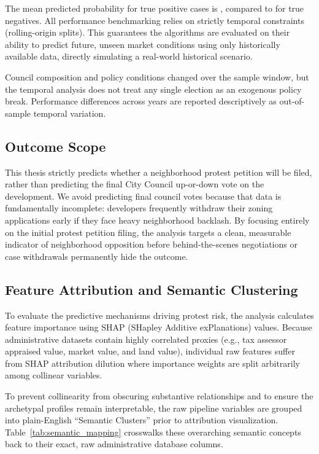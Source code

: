 \documentclass[11pt, letterpaper]{article}
\begin{document}
The mean predicted probability for true positive cases is \metricMeanProbTP{}, compared to \metricMeanProbTN{} for true negatives. All performance benchmarking relies on strictly temporal constraints (rolling-origin splits). This guarantees the algorithms are evaluated on their ability to predict future, unseen market conditions using only historically available data, directly simulating a real-world historical scenario.

Council composition and policy conditions changed over the sample window, but the temporal analysis does not treat any single election as an exogenous policy break. Performance differences across years are reported descriptively as out-of-sample temporal variation.


\subsection{Outcome Scope}
\label{sec:supporting_stages}

This thesis strictly predicts whether a neighborhood protest petition will be filed, rather than predicting the final City Council up-or-down vote on the development. We avoid predicting final council votes because that data is fundamentally incomplete: developers frequently withdraw their zoning applications early if they face heavy neighborhood backlash. By focusing entirely on the initial protest petition filing, the analysis targets a clean, measurable indicator of neighborhood opposition before behind-the-scenes negotiations or case withdrawals permanently hide the outcome.

\subsection{Feature Attribution and Semantic Clustering}
\label{sec:feature_attribution}

To evaluate the predictive mechanisms driving protest risk, the analysis calculates feature importance using SHAP (SHapley Additive exPlanations) values. Because administrative datasets contain highly correlated proxies (e.g., tax assessor appraised value, market value, and land value), individual raw features suffer from SHAP attribution dilution where importance weights are split arbitrarily among collinear variables. 

To prevent collinearity from obscuring substantive relationships and to ensure the archetypal profiles remain interpretable, the raw pipeline variables are grouped into plain-English ``Semantic Clusters'' prior to attribution visualization. Table~\ref{tab:semantic_mapping} crosswalks these overarching semantic concepts back to their exact, raw administrative database columns.
\end{document}

